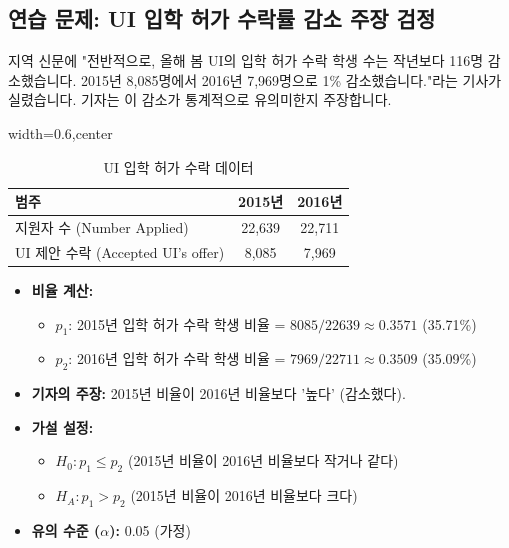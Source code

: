 \documentclass[11pt,a4paper]{book}
\theoremstyle{definition}
\begin{document}
\subsection{연습 문제: UI 입학 허가 수락률 감소 주장 검정}
\begin{examplebox}[title=시나리오:]
지역 신문에 "전반적으로, 올해 봄 UI의 입학 허가 수락 학생 수는 작년보다 116명 감소했습니다. 2015년 8,085명에서 2016년 7,969명으로 1\% 감소했습니다."라는 기사가 실렸습니다. 기자는 이 감소가 통계적으로 유의미한지 주장합니다.
\end{examplebox}

\begin{table}[h!]
\caption{UI 입학 허가 수락 데이터}
\label{tab:ui_admission_data}
\centering
\begin{adjustbox}{width=0.6\textwidth,center}
\begin{tabular}{lcc}
\toprule
\textbf{범주} & \textbf{2015년} & \textbf{2016년} \\
\midrule
지원자 수 (Number Applied) & 22,639 & 22,711 \\
UI 제안 수락 (Accepted UI's offer) & 8,085 & 7,969 \\
\bottomrule
\end{tabular}
\end{adjustbox}
\end{table}

\begin{itemize}
    \item \textbf{비율 계산:}
    \begin{itemize}
        \item $p_1$: 2015년 입학 허가 수락 학생 비율 = $8085 / 22639 \approx 0.3571$ (35.71\%)
        \item $p_2$: 2016년 입학 허가 수락 학생 비율 = $7969 / 22711 \approx 0.3509$ (35.09\%)
    \end{itemize}
    \item \textbf{기자의 주장:} 2015년 비율이 2016년 비율보다 '높다' (감소했다).
    \item \textbf{가설 설정:}
    \begin{itemize}
        \item $H_0: p_1 \le p_2$ (2015년 비율이 2016년 비율보다 작거나 같다)
        \item $H_A: p_1 > p_2$ (2015년 비율이 2016년 비율보다 크다)
    \end{itemize}
    \item \textbf{유의 수준 ($\alpha$):} 0.05 (가정)
\end{itemize}
\end{document}
